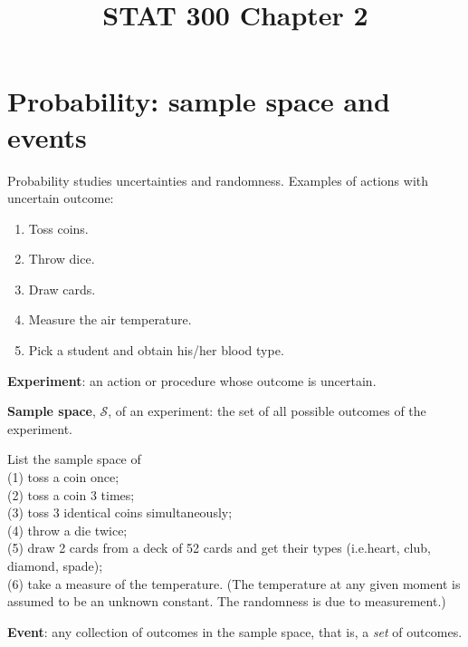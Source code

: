\documentclass[12pt]{article}
\title{STAT 300 Chapter 2}
\begin{document}
\maketitle


\section{Probability: sample space and events}

Probability studies uncertainties and randomness.
Examples of actions with uncertain outcome:
\begin{enumerate}
\item Toss coins.
\item Throw dice.
\item Draw cards.
\item Measure the air temperature.
\item Pick a student and obtain his/her blood type.
\end{enumerate}

\textbf{Experiment}: an action or procedure whose outcome is uncertain.

\textbf{Sample space}, $\mathcal{S}$,
of an experiment: the set of all possible outcomes
of the experiment.

\example List the sample space of\\
(1) toss a coin once;\\
(2) toss a coin 3 times;\\
(3) toss 3 identical coins simultaneously;\\
(4) throw a die twice;\\
(5) draw 2 cards from a deck of 52 cards and get their types
    (i.e.\@ heart, club, diamond, spade);\\
(6) take a measure of the temperature.
(The temperature at any given moment is assumed to be an
unknown constant.  The randomness is due to measurement.)


\textbf{Event}: any collection of outcomes in the sample space,
that is, a \emph{set} of outcomes.
\end{document}
